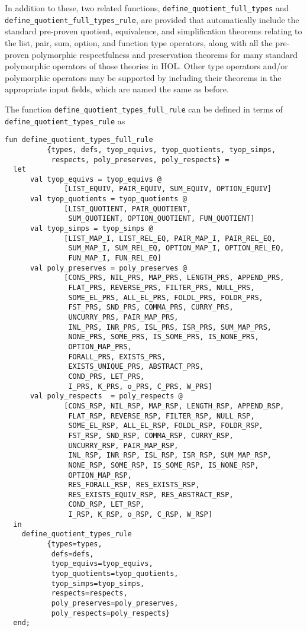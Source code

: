\documentclass[envcountsame,runningheads]{llncs}
\begin{document}
In addition to these, two related functions,
{\tt define\_quotient\_full\_types} and
{\tt define\_quotient\_full\_types\_rule},
are provided
that automatically include the standard pre-proven quotient,
equivalence, and simplification theorems relating
to the list, pair, sum, option, and function type operators, along with
all the pre-proven polymorphic respectfulness and preservation theorems
for many standard polymorphic operators of those theories in HOL.
Other type operators and/or polymorphic operators may be supported
by including their theorems in the appropriate input fields, which
are named the same as before.

The function {\tt define\_quotient\_types\_full\_rule}
can be defined in terms of {\tt define\_quotient\_types\_rule} as

\begin{verbatim}
fun define_quotient_types_full_rule
          {types, defs, tyop_equivs, tyop_quotients, tyop_simps,
           respects, poly_preserves, poly_respects} =
  let
      val tyop_equivs = tyop_equivs @
              [LIST_EQUIV, PAIR_EQUIV, SUM_EQUIV, OPTION_EQUIV]
      val tyop_quotients = tyop_quotients @
              [LIST_QUOTIENT, PAIR_QUOTIENT,
               SUM_QUOTIENT, OPTION_QUOTIENT, FUN_QUOTIENT]
      val tyop_simps = tyop_simps @
              [LIST_MAP_I, LIST_REL_EQ, PAIR_MAP_I, PAIR_REL_EQ,
               SUM_MAP_I, SUM_REL_EQ, OPTION_MAP_I, OPTION_REL_EQ,
               FUN_MAP_I, FUN_REL_EQ]
      val poly_preserves = poly_preserves @
              [CONS_PRS, NIL_PRS, MAP_PRS, LENGTH_PRS, APPEND_PRS,
               FLAT_PRS, REVERSE_PRS, FILTER_PRS, NULL_PRS,
               SOME_EL_PRS, ALL_EL_PRS, FOLDL_PRS, FOLDR_PRS,
               FST_PRS, SND_PRS, COMMA_PRS, CURRY_PRS,
               UNCURRY_PRS, PAIR_MAP_PRS,
               INL_PRS, INR_PRS, ISL_PRS, ISR_PRS, SUM_MAP_PRS,
               NONE_PRS, SOME_PRS, IS_SOME_PRS, IS_NONE_PRS,
               OPTION_MAP_PRS,
               FORALL_PRS, EXISTS_PRS,
               EXISTS_UNIQUE_PRS, ABSTRACT_PRS,
               COND_PRS, LET_PRS,
               I_PRS, K_PRS, o_PRS, C_PRS, W_PRS]
      val poly_respects  = poly_respects @
              [CONS_RSP, NIL_RSP, MAP_RSP, LENGTH_RSP, APPEND_RSP,
               FLAT_RSP, REVERSE_RSP, FILTER_RSP, NULL_RSP,
               SOME_EL_RSP, ALL_EL_RSP, FOLDL_RSP, FOLDR_RSP,
               FST_RSP, SND_RSP, COMMA_RSP, CURRY_RSP,
               UNCURRY_RSP, PAIR_MAP_RSP,
               INL_RSP, INR_RSP, ISL_RSP, ISR_RSP, SUM_MAP_RSP,
               NONE_RSP, SOME_RSP, IS_SOME_RSP, IS_NONE_RSP,
               OPTION_MAP_RSP,
               RES_FORALL_RSP, RES_EXISTS_RSP,
               RES_EXISTS_EQUIV_RSP, RES_ABSTRACT_RSP,
               COND_RSP, LET_RSP,
               I_RSP, K_RSP, o_RSP, C_RSP, W_RSP]
  in
    define_quotient_types_rule
          {types=types,
           defs=defs,
           tyop_equivs=tyop_equivs,
           tyop_quotients=tyop_quotients,
           tyop_simps=tyop_simps,
           respects=respects,
           poly_preserves=poly_preserves,
           poly_respects=poly_respects}
  end;
\end{verbatim}
\end{document}
